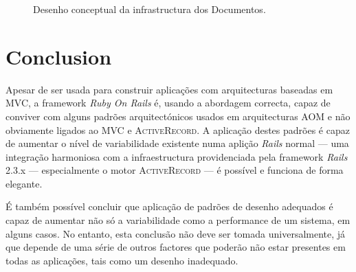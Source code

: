 \documentclass[9pt,a4paper]{extarticle}
\begin{document}
\begin{multicols}{2}
\begin{figure}[H]
  \caption{Desenho conceptual da infrastructura dos Documentos.}
  \label{fig:documents_conceptual}
\end{figure}

\section{Conclusion}\label{sec:conclusion}


Apesar de ser usada para construir aplicações com arquitecturas baseadas em MVC, a framework \emph{Ruby On Rails} é, usando a abordagem correcta, capaz de conviver com alguns padrões arquitectónicos usados em arquitecturas AOM e não obviamente ligados ao MVC e \textsc{ActiveRecord}. A aplicação destes padrões é capaz de aumentar o nível de variabilidade existente numa aplição \emph{Rails} normal --- uma integração harmoniosa com a infraestructura providenciada pela framework \emph{Rails} 2.3.x --- especialmente o motor \textsc{ActiveRecord} --- é possível e funciona de forma elegante.


É também possível concluir que aplicação de padrões de desenho adequados é capaz de aumentar não só a variabilidade como a performance de um sistema, em alguns casos. No entanto, esta conclusão não deve ser tomada universalmente, já que depende de uma série de outros factores que poderão não estar presentes em todas as aplicações, tais como um desenho inadequado.



\end{multicols}
\end{document}
